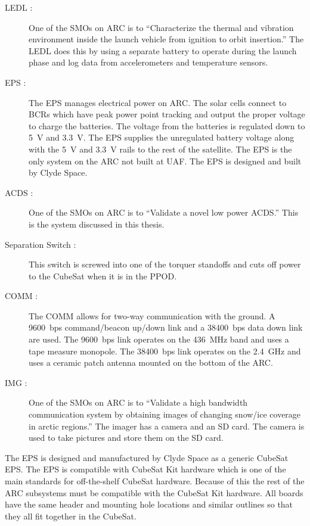 \begin{description}
    \item[\acs{LEDL} :] One of the \acp{SMO} on \ac{ARC} is to \enquote{Characterize the thermal and vibration environment inside the launch vehicle from ignition to orbit insertion.}\cite{ARCweb} The \ac{LEDL} does this by using a separate battery to operate during the launch phase and log data from accelerometers and temperature sensors.
    \item[\acs{EPS} :] The \ac{EPS} manages electrical power on \ac{ARC}. The solar cells connect to \acp{BCR} which have peak power point tracking and output the proper voltage to charge the batteries. The voltage from the batteries is regulated down to 5~V and 3.3~V. The \ac{EPS} supplies the unregulated battery voltage along with the 5~V and 3.3~V rails to the rest of the satellite. The \ac{EPS} is the only system on the \ac{ARC} not built at UAF. The \ac{EPS} is designed and built by Clyde Space. \cite{ClydeEPS}
    \item[\acs{ACDS} :] One of the \acp{SMO} on \ac{ARC} is to \enquote{Validate a novel low power \acf{ACDS}.} \cite{ARCweb} This is the system discussed in this thesis.
    \item[Separation Switch :] This switch is screwed into one of the torquer standoffs and cuts off power to the CubeSat when it is in the \ac{PPOD}.
    \item[\acs{COMM} :] The \ac{COMM} allows for two-way communication with the ground. A 9600~bps command/beacon up/down link and a 38400~bps data down link are used. The 9600~bps link operates on the 436~MHz band and uses a tape measure monopole. The 38400~bps link operates on the 2.4~GHz and uses a ceramic patch antenna mounted on the bottom of the \ac{ARC}.
    \item[\acs{IMG} :] One of the \acp{SMO} on \ac{ARC} is to \enquote{Validate a high bandwidth communication system by obtaining images of changing snow/ice coverage in arctic regions.}\cite{ARCweb} The imager has a camera and an SD card. The camera is used to take pictures and store them on the SD card.
\end{description}

The \ac{EPS} is designed and manufactured by Clyde Space as a generic CubeSat \ac{EPS}. The \ac{EPS} is compatible with CubeSat Kit\cite{CSK} hardware which is one of the main standards for off-the-shelf CubeSat hardware. Because of this the rest of the \ac{ARC} subsystems must be compatible with the CubeSat Kit hardware. All boards have the same header and mounting hole locations and similar outlines so that they all fit together in the CubeSat.

